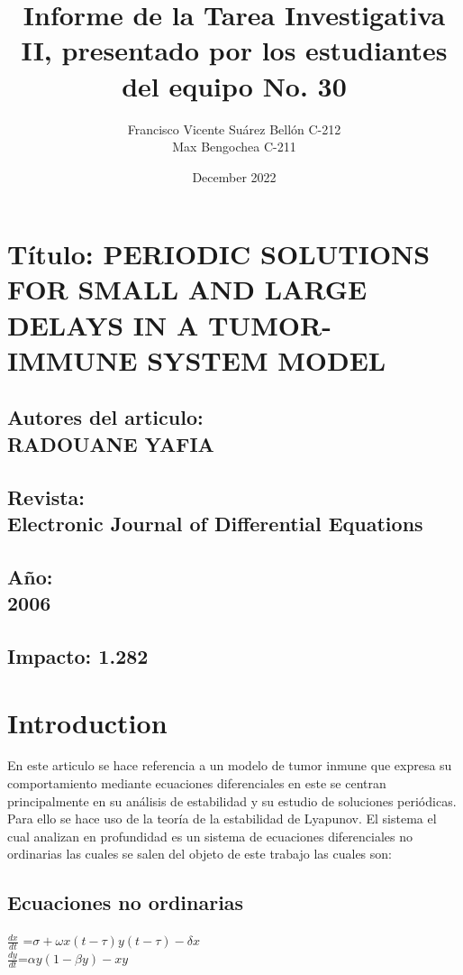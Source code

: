\documentclass{article}
\title{Informe de la Tarea Investigativa II, presentado por los
estudiantes del equipo No. 30}
\author{Francisco Vicente Suárez Bellón C-212 \\
  Max Bengochea C-211}
\date{December 2022}
\begin{document}
\maketitle
\section*{Título: PERIODIC SOLUTIONS FOR SMALL AND LARGE DELAYS IN
A TUMOR-IMMUNE SYSTEM MODEL}
\subsection*{\centering Autores del articulo:\\
                 RADOUANE YAFIA
             }
\subsection*{\centering Revista: \\ 
                Electronic Journal of Differential Equations
             }
\subsection*{\centering Año: \\ 
                2006
             }
\subsection*{\centering Impacto: 1.282 }

\section{Introduction}
\noindent En este articulo se hace referencia a un modelo de tumor inmune que expresa su comportamiento mediante 
 ecuaciones diferenciales en este se centran principalmente en su análisis de estabilidad y su estudio de
    soluciones periódicas. Para ello se hace uso de la teoría de la estabilidad de Lyapunov. El sistema el cual analizan en 
    profundidad es un sistema de ecuaciones diferenciales no ordinarias las cuales se 
    salen del objeto de este trabajo las cuales son:
    \centering
    \subsection*{Ecuaciones no ordinarias}
      $\frac{d x}{d t} $ =$\sigma + \omega x(t- \tau )y(t- \tau )-
        \delta x
        $
        \\
        $\frac{d y}{d t}$=$\alpha y(1-\beta y)-xy$
\end{document}
